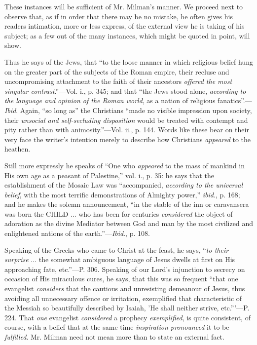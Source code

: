 These instances will be sufficient of Mr. Milman's
manner. We proceed next to observe that, as if in order that there may
be no mistake, he often gives his readers intimation, more or less
express, of the external view he is taking of his subject; as a few
out of the many instances, which might be quoted in point, will show.

Thus he says of the Jews, that ``to the loose
manner in which religious belief hung on the greater part of the
subjects of the Roman empire, their recluse and uncompromising
attachment to the faith of their ancestors \emph{offered the most
singular contrast}.''—Vol. i., p. 345; and that ``the Jews stood
alone, \emph{according to the language and opinion of the Roman world},
as a nation of religious fanatics''.—\emph{Ibid}. Again, ``so long as''
the Christians ``made no visible impression upon society, their \emph{unsocial
and self-secluding disposition} would be treated with contempt and
pity rather than with animosity.''—Vol. ii., p. 144. Words like these
bear on their very face the writer's intention merely to describe how
Christians \emph{appeared} to the heathen.

Still more expressly he speaks of ``One who \emph{appeared}
to the mass of mankind in His own age as a peasant of Palestine,'' vol.
i., p. 35: he says that the establishment of the Mosaic Law was ``accompanied,
\emph{according to the universal belief}, with the most terrific
demonstrations of Almighty power,'' \emph{ibid}., p. 168; and he makes
the solemn announcement, ``in the stable of the inn or caravansera was
born the CHILD ... who has been
for centuries \emph{considered} the object of adoration as the divine
Mediator between God and man by the most civilized and
enlightened nations of the earth.''—\emph{Ibid}., p. 108.

Speaking of the Greeks who came to Christ at the
feast, he says, ``\emph{to their surprise} ... the somewhat ambiguous
language of Jesus dwells at first on His approaching fate,
etc.''—P. 306. Speaking of our Lord's injunction to secrecy on
occasion of His miraculous cures, he says, that this was so frequent ``that
one evangelist \emph{considers} that the cautious and unresisting
demeanour of Jesus, thus avoiding all unnecessary offence or
irritation, exemplified that characteristic of the Messiah so
beautifully described by Isaiah, 'He shall neither strive, etc.'''—P.
224. That \emph{one} evangelist \emph{considered} a prophecy \emph{exemplified},
is quite consistent, of course, with a belief that at the same time \emph{inspiration
pronounced} it to be \emph{fulfilled}. Mr. Milman need not mean
more than to state an external fact.

